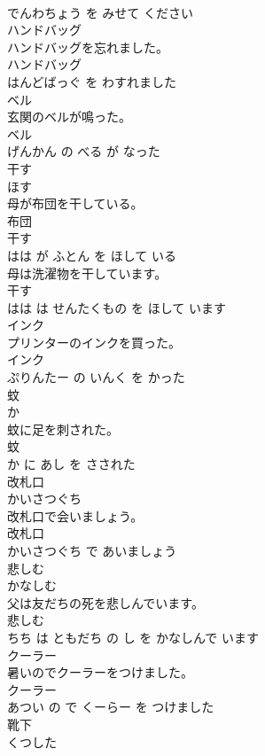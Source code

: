 \documentclass[8pt]{extreport}
\begin{document}
\begin{CJK}{UTF8}{min}
\\	でんわちょう を みせて ください			
\\	ハンドバッグ	
\\	ハンドバッグを忘れました。	
\\	ハンドバッグ 
\\	はんどばっぐ を わすれました			
\\	ベル	
\\	玄関のベルが鳴った。	
\\	ベル 
\\	げんかん の べる が なった			
\\	干す	
\\	ほす			
\\	母が布団を干している。	
\\	布団 
\\	干す 
\\	はは が ふとん を ほして いる			
\\	母は洗濯物を干しています。	
\\	干す 
\\	はは は せんたくもの を ほして います			
\\	インク	
\\	プリンターのインクを買った。	
\\	インク 
\\	ぷりんたー の いんく を かった			
\\	蚊	
\\	か			
\\	蚊に足を刺された。	
\\	蚊 
\\	か に あし を さされた			
\\	改札口	
\\	かいさつぐち			
\\	改札口で会いましょう。	
\\	改札口 
\\	かいさつぐち で あいましょう			
\\	悲しむ	
\\	かなしむ			
\\	父は友だちの死を悲しんでいます。	
\\	悲しむ 
\\	ちち は ともだち の し を かなしんで います			
\\	クーラー	
\\	暑いのでクーラーをつけました。	
\\	クーラー 
\\	あつい の で くーらー を つけました			
\\	靴下	
\\	くつした			

\end{CJK}
\end{document}
